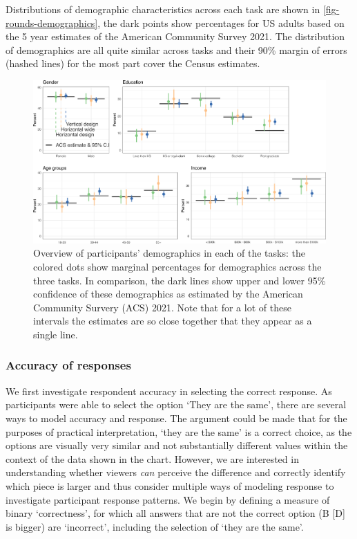 \documentclass[
]{jds}
\begin{document}
Distributions of demographic characteristics across each task are shown
in \autoref{fig-rounds-demographics}, the dark points show percentages
for US adults based on the 5 year estimates of the American Community
Survey 2021. The distribution of demographics are all quite similar
across tasks and their 90\% margin of errors (hashed lines) for the most
part cover the Census estimates.

\begin{figure}[hbt]

{\centering \includegraphics{./figures/fig-rounds-demographics-1.png}

}

\caption{\label{fig-rounds-demographics}Overview of participants'
demographics in each of the tasks: the colored dots show marginal
percentages for demographics across the three tasks. In comparison, the
dark lines show upper and lower 95\% confidence of these demographics as
estimated by the American Community Survery (ACS) 2021. Note that for a
lot of these intervals the estimates are so close together that they
appear as a single line.}

\end{figure}

\hypertarget{accuracy-of-responses}{%
\subsubsection{Accuracy of responses}\label{accuracy-of-responses}}

We first investigate respondent accuracy in selecting the correct
response. As participants were able to select the option `They are the
same', there are several ways to model accuracy and response. The
argument could be made that for the purposes of practical
interpretation, `they are the same' is a correct choice, as the options
are visually very similar and not substantially different values within
the context of the data shown in the chart. However, we are interested
in understanding whether viewers \emph{can} perceive the difference and
correctly identify which piece is larger and thus consider multiple ways
of modeling response to investigate participant response patterns. We
begin by defining a measure of binary `correctness', for which all
answers that are not the correct option (B {[}D{]} is bigger) are
`incorrect', including the selection of `they are the same'.
\end{document}
